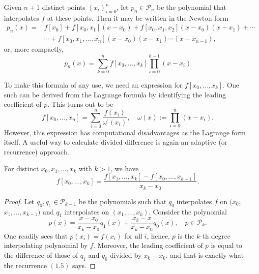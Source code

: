\documentclass[a4paper]{scrartcl}
\begin{document}
\begin{theorem}
Given $n+1$ distinct points $\left(x_{i}\right)_{i=0}^{n}$, let $p_{n} \in \mathcal{P}_{n}$ be the polynomial that interpolates $f$ at these points. Then it may be written in the Newton form
\begin{align*}
  p_{n}(x)=& f\left[x_{0}\right]+f\left[x_{0}, x_{1}\right]\left(x-x_{0}\right)+f\left[x_{0}, x_{1}, x_{2}\right]\left(x-x_{0}\right)\left(x-x_{1}\right)+\cdots \\
  & \cdots+f\left[x_{0}, x_{1}, \ldots, x_{n}\right]\left(x-x_{0}\right)\left(x-x_{1}\right) \cdots\left(x-x_{n-1}\right),
\end{align*}
or, more compactly,
$$
p_{n}(x)=\sum_{k=0}^{n} f\left[x_{0}, \ldots, x_{k}\right] \prod_{i=0}^{k-1}\left(x-x_{i}\right)
$$
\end{theorem}

To make this formula of any use, we need an expression for $f[x_0, \dots, x_k]$. One such can be derived from the Lagrange formula by identifying the leading coefficient of $p$. This turns out to be
$$
f\left[x_{0}, \ldots, x_{n}\right]=\sum_{i=0}^{n} \frac{f\left(x_{i}\right)}{\omega^{\prime}\left(x_{i}\right)}, \quad \omega(x):=\prod_{i=0}^{n}\left(x-x_{i}\right) .
$$
However, this expression has computational disadvantages as the Lagrange form itself. A useful way to calculate divided difference is again an adaptive (or recurrence) approach.

\begin{theorem}
  For distinct $x_0, x_1, \dots, x_k$ with $k > 1$, we have
  $$
  f[x_0, \dots, x_k] = \frac{f[x_1, \dots, x_k] - f[x_0, \dots, x_{k - 1}]}{x_k - x_0}.
  $$
\end{theorem}
\begin{proof}
  Let $q_0, q_1 \in \mathcal{P}_{k - 1}$ be the polynomials such that $q_0$ interpolates $f$ on $(x_0$, $x_1, \dots, x_{k - 1})$ and $q_1$ interpolates on $(x_1, \dots, x_k)$. Consider the polynomial
  $$
  p(x)=\frac{x-x_{0}}{x_{k}-x_{0}} q_{1}(x)+\frac{x_{k}-x}{x_{k}-x_{0}} q_{0}(x), \quad p \in \mathcal{P}_{k} .
  $$
  One readily sees that $p\left(x_{i}\right)=f\left(x_{i}\right)$ for all $i$, hence, $p$ is the $k$-th degree interpolating polynomial by $f$. Moreover, the leading coefficient of $p$ is equal to the difference of those of $q_{1}$ and $q_{0}$ divided by $x_{k}-x_{0}$, and that is exactly what the recurrence $(1.5)$ says.
\end{proof}
\end{document}
